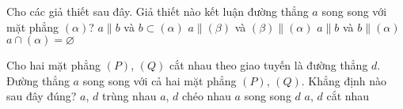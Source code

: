 	\begin{ex}%
		Cho các giả thiết sau đây. Giả thiết nào kết luận đường thẳng $a$ song song với mặt phẳng $(\alpha)$?
		\choice
		{$a \parallel b$ và $b \subset (\alpha)$}
		{$a \parallel (\beta)$ và $(\beta) \parallel (\alpha)$}
		{$a \parallel b$ và $b \parallel (\alpha)$}
		{\True $a \cap (\alpha)=\varnothing$}
	\end{ex}

	\begin{ex}%
		Cho hai mặt phẳng $(P)$, $(Q)$ cắt nhau theo giao tuyến là đường thẳng $d$. Đường thẳng $a$ song song với cả hai mặt phẳng $(P)$, $(Q)$. Khẳng định nào sau đây đúng?
		\choice
		{$a$, $d$ trùng nhau}
		{$a$, $d$ chéo nhau}
		{\True $a$ song song $d$}
		{$a$, $d$ cắt nhau}
	\end{ex}

